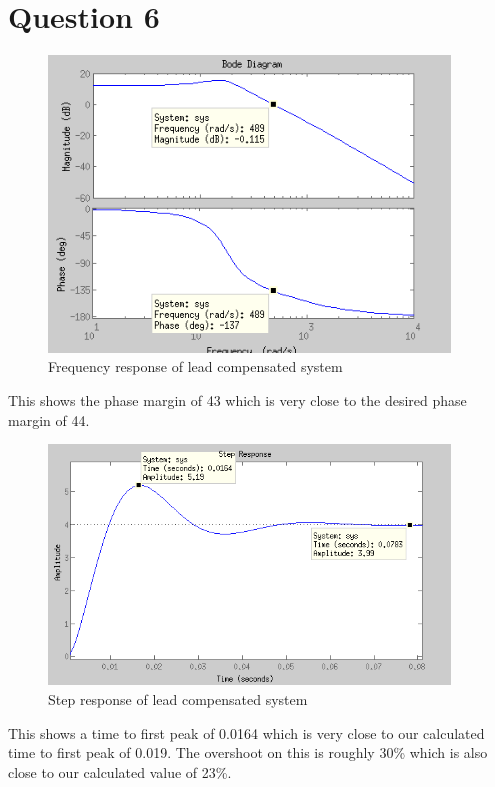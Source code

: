 \documentclass{article}
\begin{document}
\section{Question 6} %
\label{sec:question_6}
\begin{figure}[!htbp]
    \centering
    \includegraphics[width=0.95\textwidth]{sim_lead_rad.png}
    \caption{Frequency response of lead compensated system}
\end{figure}
This shows the phase margin of 43 which is very close to the desired phase margin of 44.

\begin{figure}[!htbp]
    \centering
    \includegraphics[width=0.95\textwidth]{sim_lead_step.png}
    \caption{Step response of lead compensated system}
\end{figure}

This shows a time to first peak of 0.0164 which is very close to our calculated time to first peak of 0.019. The overshoot on this is roughly 30\% which is also close to our calculated value of 23\%.
\end{document}
